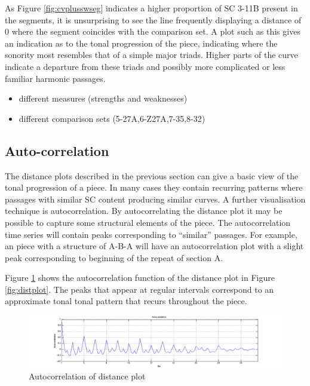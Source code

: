\documentclass{article}
\begin{document}
As Figure \ref{fig:cvplusswseg} indicates a higher proportion of SC
3-11B present in the segments, it is unsurprising to see the line
frequently displaying a distance of 0 where the segment coincides with
the comparison set. A plot such as this gives an indication as to the
tonal progression of the piece, indicating where the sonority most
resembles that of a simple major triads. Higher parts of the curve
indicate a departure from these triads and possibly more complicated
or less familiar harmonic passages.

\begin{itemize}
\item different measures (strengths and weaknesses)
\item different comparison sets (5-27A,6-Z27A,7-35,8-32)
\end{itemize}
\subsection{Auto-correlation}
\label{sec-9-2}

The distance plots described in the previous section can give a basic
view of the tonal progression of a piece. In many cases they contain
recurring patterns where passages with similar SC content producing
similar curves. A further visualisation technique is
autocorrelation. By autocorrelating the distance plot it may be
possible to capture some structural elements of the piece. The
autocorrelation time series will contain peaks corresponding to
``similar'' passages. For example, an piece with a structure of A-B-A
will have an autocorrelation plot with a slight peak corresponding to
beginning of the repeat of section A.

Figure \ref{fig:autocorr} shows the autocorrelation function of the
distance plot in Figure \ref{fig:distplot}. The peaks that appear at
regular intervals correspond to an approximate tonal tonal pattern
that recurs throughout the piece.

\begin{figure}[htb]
\centering
\includegraphics[scale=0.35]{../plots/autocorr.png}
\caption{\label{fig:autocorr}Autocorrelation of distance plot}
\end{figure}
\end{document}
